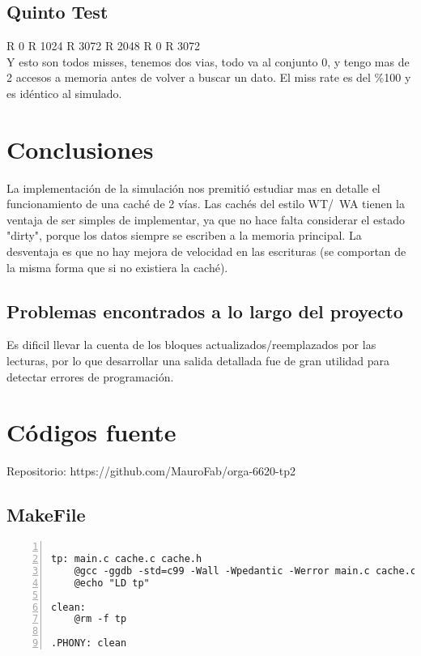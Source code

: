 \documentclass[11pt,a4paper, spanish]{article}
\begin{document}
\subsection{Quinto Test}
R 0
R 1024
R 3072
R 2048
R 0
R 3072\\

Y esto son todos misses, tenemos dos vias, todo va al conjunto 0, y tengo mas de 2 accesos a memoria antes de volver a buscar un dato. El miss rate es del \%100 y es idéntico al simulado.

\section{Conclusiones}

La implementación de la simulación nos premitió estudiar mas en detalle el funcionamiento de una caché de 2 vías. Las cachés
del estilo WT/~WA tienen la ventaja de ser simples de implementar, ya que no hace falta considerar el estado "dirty",
porque los datos siempre se escriben a la memoria principal. La desventaja es que no hay mejora de velocidad en las
escrituras (se comportan de la misma forma que si no existiera la caché).


\subsection{Problemas encontrados a lo largo del proyecto}

Es dificil llevar la cuenta de los bloques actualizados/reemplazados por las lecturas, por lo que desarrollar
una salida detallada fue de gran utilidad para detectar errores de programación.



\newpage

\section{C\'odigos fuente}

Repositorio: https://github.com/MauroFab/orga-6620-tp2

\subsection{MakeFile}

\begin{lstlisting}[numbers=left, tabsize=2, basicstyle=\fontsize{11}{13}\ttfamily, frame=single, caption={makefile}]

tp: main.c cache.c cache.h
	@gcc -ggdb -std=c99 -Wall -Wpedantic -Werror main.c cache.c -o tp -lm
	@echo "LD tp"

clean:
	@rm -f tp

.PHONY: clean

\end{lstlisting}
\end{document}
